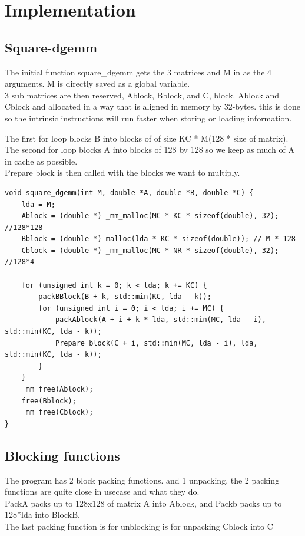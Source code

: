 \documentclass[a4paper,10pt,titlepage]{report}
\begin{document}
\section{Implementation}

\subsection{Square-dgemm}

The initial function square\_dgemm gets the 3 matrices and M in as the 4 arguments. M is directly saved as a global variable. \\
3 sub matrices are then reserved, Ablock, Bblock, and C, block. Ablock and Cblock and allocated in a way that is aligned in memory by 32-bytes. this is done so the intrinsic instructions will run faster when storing or loading information. \\ \vspace{5mm}

The first for loop blocks B into blocks of of size KC * M(128 * size of matrix). The second for loop blocks A into blocks of 128 by 128 so we keep as much of A in cache as possible. \\

Prepare block is then called with the blocks we want to multiply.

\begin{lstlisting} 
void square_dgemm(int M, double *A, double *B, double *C) {
    lda = M;
    Ablock = (double *) _mm_malloc(MC * KC * sizeof(double), 32); //128*128
    Bblock = (double *) malloc(lda * KC * sizeof(double)); // M * 128
    Cblock = (double *) _mm_malloc(MC * NR * sizeof(double), 32); //128*4

    for (unsigned int k = 0; k < lda; k += KC) {
        packBBlock(B + k, std::min(KC, lda - k));
        for (unsigned int i = 0; i < lda; i += MC) {
            packAblock(A + i + k * lda, std::min(MC, lda - i), std::min(KC, lda - k));
            Prepare_block(C + i, std::min(MC, lda - i), lda, std::min(KC, lda - k));
        }
    }
    _mm_free(Ablock);
    free(Bblock);
    _mm_free(Cblock);
}
\end{lstlisting}

\subsection{Blocking functions}
The program has 2 block packing functions. and 1 unpacking, the 2 packing functions are quite close in usecase and what they do. \\
PackA packs up to 128x128 of matrix A into Ablock, and Packb packs up to 128*lda into BlockB.\\ \vspace{0mm}
The last packing function is for unblocking is for unpacking Cblock into C
\end{document}
